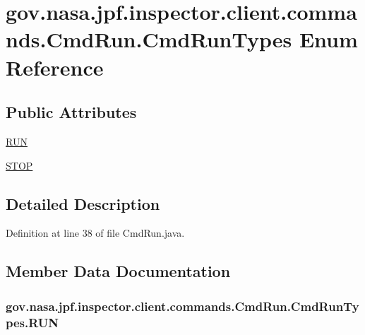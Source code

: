 \hypertarget{enumgov_1_1nasa_1_1jpf_1_1inspector_1_1client_1_1commands_1_1_cmd_run_1_1_cmd_run_types}{}\section{gov.\+nasa.\+jpf.\+inspector.\+client.\+commands.\+Cmd\+Run.\+Cmd\+Run\+Types Enum Reference}
\label{enumgov_1_1nasa_1_1jpf_1_1inspector_1_1client_1_1commands_1_1_cmd_run_1_1_cmd_run_types}
\subsection*{Public Attributes}
\begin{DoxyCompactItemize}
\item 
\hyperlink{enumgov_1_1nasa_1_1jpf_1_1inspector_1_1client_1_1commands_1_1_cmd_run_1_1_cmd_run_types_a1fdedcc1b636def90bded4038dc39abc}{R\+UN}
\item 
\hyperlink{enumgov_1_1nasa_1_1jpf_1_1inspector_1_1client_1_1commands_1_1_cmd_run_1_1_cmd_run_types_a1284694759a2df2899bce81991b3e489}{S\+T\+OP}
\end{DoxyCompactItemize}


\subsection{Detailed Description}


Definition at line 38 of file Cmd\+Run.\+java.



\subsection{Member Data Documentation}
\subsubsection[{\texorpdfstring{R\+UN}{RUN}}]{\setlength{\rightskip}{0pt plus 5cm}gov.\+nasa.\+jpf.\+inspector.\+client.\+commands.\+Cmd\+Run.\+Cmd\+Run\+Types.\+R\+UN}\hypertarget{enumgov_1_1nasa_1_1jpf_1_1inspector_1_1client_1_1commands_1_1_cmd_run_1_1_cmd_run_types_a1fdedcc1b636def90bded4038dc39abc}{}\label{enumgov_1_1nasa_1_1jpf_1_1inspector_1_1client_1_1commands_1_1_cmd_run_1_1_cmd_run_types_a1fdedcc1b636def90bded4038dc39abc}


